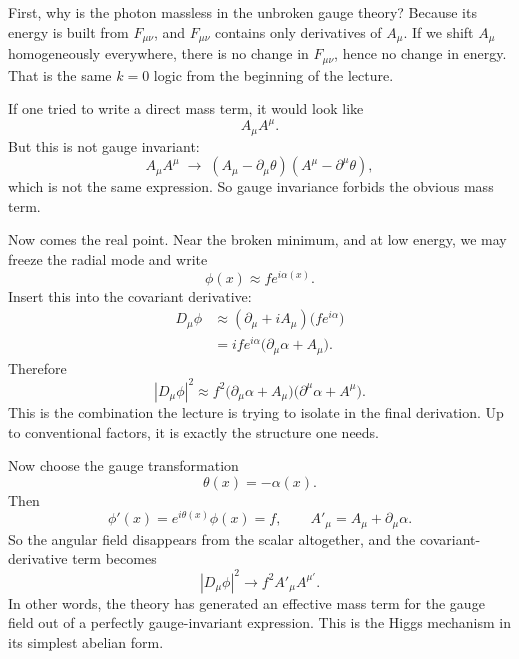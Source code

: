 First, why is the photon massless in the unbroken gauge theory? Because its energy is built from \(F_{\mu\nu}\), and \(F_{\mu\nu}\) contains only derivatives of \(A_\mu\). If we shift \(A_\mu\) homogeneously everywhere, there is no change in \(F_{\mu\nu}\), hence no change in energy. That is the same \(k=0\) logic from the beginning of the lecture.

If one tried to write a direct mass term, it would look like
\begin{equation}
A_\mu A^\mu.
\end{equation}
But this is not gauge invariant:
\begin{equation}
A_\mu A^\mu
\;\longrightarrow\;
(A_\mu-\partial_\mu\theta)(A^\mu-\partial^\mu\theta),
\end{equation}
which is not the same expression. So gauge invariance forbids the obvious mass term.

Now comes the real point. Near the broken minimum, and at low energy, we may freeze the radial mode and write
\begin{equation}
\phi(x)\approx f e^{i\alpha(x)}.
\end{equation}
Insert this into the covariant derivative:
\begin{align}
D_\mu\phi
&\approx
(\partial_\mu+iA_\mu)\bigl(f e^{i\alpha}\bigr) \\
&=
i f e^{i\alpha}\bigl(\partial_\mu\alpha + A_\mu\bigr).
\end{align}
Therefore
\begin{equation}
|D_\mu\phi|^2
\approx
f^2\bigl(\partial_\mu\alpha + A_\mu\bigr)
\bigl(\partial^\mu\alpha + A^\mu\bigr).
\end{equation}
This is the combination the lecture is trying to isolate in the final derivation. Up to conventional factors, it is exactly the structure one needs.

Now choose the gauge transformation
\begin{equation}
\theta(x)=-\alpha(x).
\end{equation}
Then
\begin{equation}
\phi'(x)=e^{i\theta(x)}\phi(x)=f,
\qquad
A'_\mu = A_\mu + \partial_\mu\alpha.
\end{equation}
So the angular field disappears from the scalar altogether, and the covariant-derivative term becomes
\begin{equation}
|D_\mu\phi|^2 \to f^2 A'_\mu A^{\mu\prime}.
\end{equation}
In other words, the theory has generated an effective mass term for the gauge field out of a perfectly gauge-invariant expression. This is the Higgs mechanism in its simplest abelian form.

